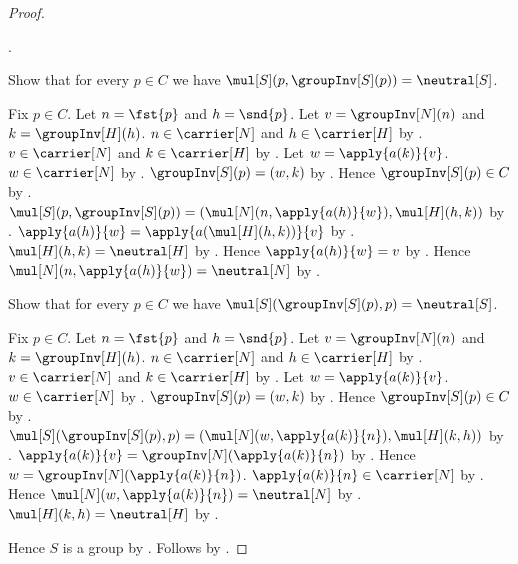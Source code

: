 \begin{proof}
\begin{subproof}
            .
    \end{subproof}
    Show that for every $p\in C$ we have
        $\mul[S](p,\groupInv[S](p))=\neutral[S]$.
    \begin{subproof}
        Fix $p\in C$.
        Let $n=\fst{p}$ and $h=\snd{p}$.
        Let $v=\groupInv[N](n)$ and $k=\groupInv[H](h)$.
        $n\in\carrier[N]$ and $h\in\carrier[H]$ by
            .
        $v\in\carrier[N]$ and $k\in\carrier[H]$ by
            .
        Let $w=\apply{a(k)}{v}$.
        $w\in\carrier[N]$ by .
        $\groupInv[S](p)=(w,k)$ by
            .
        Hence $\groupInv[S](p)\in C$ by .
        $\mul[S](p,\groupInv[S](p))=
            (\mul[N](n,\apply{a(h)}{w}),
             \mul[H](h,k))$ by
            .
        $\apply{a(h)}{w}=
            \apply{a(\mul[H](h,k))}{v}$ by
            .
        $\mul[H](h,k)=\neutral[H]$ by
            .
        Hence $\apply{a(h)}{w}=v$ by
            .
        Hence $\mul[N](n,\apply{a(h)}{w})=\neutral[N]$ by
            .
    \end{subproof}
    Show that for every $p\in C$ we have
        $\mul[S](\groupInv[S](p),p)=\neutral[S]$.
    \begin{subproof}
        Fix $p\in C$.
        Let $n=\fst{p}$ and $h=\snd{p}$.
        Let $v=\groupInv[N](n)$ and $k=\groupInv[H](h)$.
        $n\in\carrier[N]$ and $h\in\carrier[H]$ by
            .
        $v\in\carrier[N]$ and $k\in\carrier[H]$ by
            .
        Let $w=\apply{a(k)}{v}$.
        $w\in\carrier[N]$ by .
        $\groupInv[S](p)=(w,k)$ by
            .
        Hence $\groupInv[S](p)\in C$ by .
        $\mul[S](\groupInv[S](p),p)=
            (\mul[N](w,\apply{a(k)}{n}),
             \mul[H](k,h))$ by
            .
        $\apply{a(k)}{v}=\groupInv[N](\apply{a(k)}{n})$ by
            .
        Hence $w=\groupInv[N](\apply{a(k)}{n})$.
        $\apply{a(k)}{n}\in\carrier[N]$ by
            .
        Hence $\mul[N](w,\apply{a(k)}{n})=\neutral[N]$ by
            .
        $\mul[H](k,h)=\neutral[H]$ by
            .
    \end{subproof}
    Hence $S$ is a group by
        .
    Follows by .
\end{proof}

